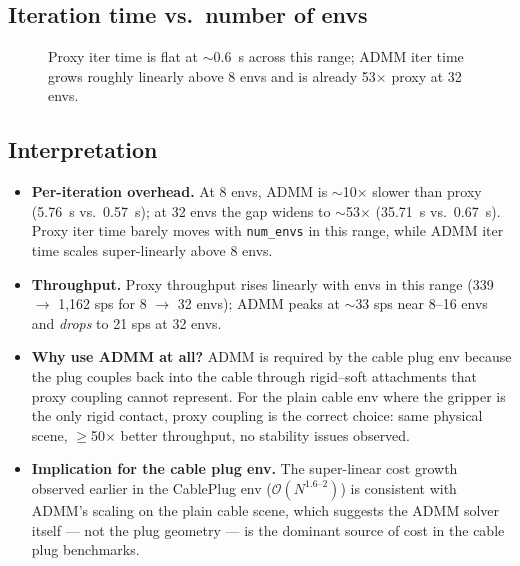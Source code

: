 \documentclass[11pt,a4paper]{article}
\begin{document}
\subsection{Iteration time vs.\ number of envs}

\begin{figure}[H]
\centering
{}
\caption*{\sffamily\small\color{nvgrey}Proxy iter time is flat at $\sim$0.6~s across this range; ADMM iter time grows roughly linearly above 8 envs and is already 53$\times$ proxy at 32 envs.}
\end{figure}

\subsection{Interpretation}

\begin{itemize}\setlength\itemsep{2pt}
  \item \textbf{Per-iteration overhead.} At 8 envs, ADMM is $\sim$10$\times$
    slower than proxy (5.76~s vs.\ 0.57~s); at 32 envs the gap widens to
    $\sim$53$\times$ (35.71~s vs.\ 0.67~s). Proxy iter time barely moves
    with \texttt{num\_envs} in this range, while ADMM iter time scales
    super-linearly above 8 envs.
  \item \textbf{Throughput.} Proxy throughput rises linearly with envs in
    this range (339 $\rightarrow$ 1{,}162 sps for 8 $\rightarrow$ 32
    envs); ADMM peaks at $\sim$33 sps near 8--16 envs and \emph{drops} to
    21 sps at 32 envs.
  \item \textbf{Why use ADMM at all?} ADMM is required by the cable plug
    env because the plug couples back into the cable through rigid--soft
    attachments that proxy coupling cannot represent. For the plain cable
    env where the gripper is the only rigid contact, proxy coupling is the
    correct choice: same physical scene, $\geq$50$\times$ better throughput,
    no stability issues observed.
  \item \textbf{Implication for the cable plug env.} The super-linear
    cost growth observed earlier in the CablePlug env
    ($\mathcal{O}(N^{1.6\text{--}2})$) is consistent with ADMM's scaling
    on the plain cable scene, which suggests the ADMM solver itself ---
    not the plug geometry --- is the dominant source of cost in the cable
    plug benchmarks.
\end{itemize}
\end{document}
